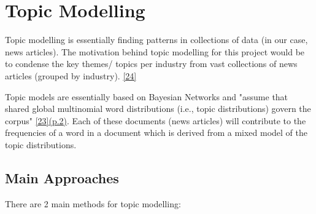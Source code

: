 \section{Topic Modelling}

Topic modelling is essentially finding patterns in collections of data (in our case, news articles). The motivation behind topic modelling for this project would be to condense the key themes/ topics per industry from vast collections of news articles (grouped by industry). \hyperlink{24}{[24]}

Topic models are essentially based on Bayesian Networks and "assume that shared global multinomial word distributions (i.e., topic distributions) govern the corpus" \hyperlink{23}{[23](p.2)}.  Each of these documents (news articles) will contribute to the frequencies of a word in a document which is derived from a mixed model of the topic distributions.

\subsection{Main Approaches} \label{Topic Modelling appoaches}

There are 2 main methods for topic modelling: 

